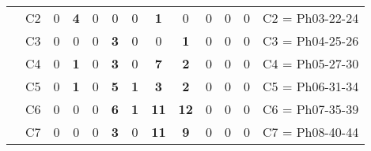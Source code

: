 \begin{table}[H]
{\begin{tabular}{|ccrrrrrrrrrrc|}
\multicolumn{1}{|c|}{}                                      & \multicolumn{1}{c|}{C2} & \multicolumn{1}{c|}{0}          & \multicolumn{1}{c|}{\textbf{4}} & \multicolumn{1}{c|}{0}  & \multicolumn{1}{c|}{0}          & \multicolumn{1}{c|}{0}          & \multicolumn{1}{c|}{\textbf{1}}  & \multicolumn{1}{c|}{0}           & \multicolumn{1}{c|}{0}  & \multicolumn{1}{c|}{0}  & \multicolumn{1}{c|}{0}          & C2 = Ph03-22-24   \\ \cline{2-13}
\multicolumn{1}{|c|}{}                                      & \multicolumn{1}{c|}{C3} & \multicolumn{1}{c|}{0}          & \multicolumn{1}{c|}{0}          & \multicolumn{1}{c|}{0}  & \multicolumn{1}{c|}{\textbf{3}} & \multicolumn{1}{c|}{0}          & \multicolumn{1}{c|}{0}           & \multicolumn{1}{c|}{\textbf{1}}  & \multicolumn{1}{c|}{0}  & \multicolumn{1}{c|}{0}  & \multicolumn{1}{c|}{0}          & C3 = Ph04-25-26   \\ \cline{2-13}
\multicolumn{1}{|c|}{}                                      & \multicolumn{1}{c|}{C4} & \multicolumn{1}{c|}{0}          & \multicolumn{1}{c|}{\textbf{1}} & \multicolumn{1}{c|}{0}  & \multicolumn{1}{c|}{\textbf{3}} & \multicolumn{1}{c|}{0}          & \multicolumn{1}{c|}{\textbf{7}}  & \multicolumn{1}{c|}{\textbf{2}}  & \multicolumn{1}{c|}{0}  & \multicolumn{1}{c|}{0}  & \multicolumn{1}{c|}{0}          & C4 = Ph05-27-30   \\ \cline{2-13}
\multicolumn{1}{|c|}{}                                      & \multicolumn{1}{c|}{C5} & \multicolumn{1}{c|}{0}          & \multicolumn{1}{c|}{\textbf{1}} & \multicolumn{1}{c|}{0}  & \multicolumn{1}{c|}{\textbf{5}} & \multicolumn{1}{c|}{\textbf{1}} & \multicolumn{1}{c|}{\textbf{3}}  & \multicolumn{1}{c|}{\textbf{2}}  & \multicolumn{1}{c|}{0}  & \multicolumn{1}{c|}{0}  & \multicolumn{1}{c|}{0}          & C5 = Ph06-31-34   \\ \cline{2-13}
\multicolumn{1}{|c|}{}                                      & \multicolumn{1}{c|}{C6} & \multicolumn{1}{c|}{0}          & \multicolumn{1}{c|}{0}          & \multicolumn{1}{c|}{0}  & \multicolumn{1}{c|}{\textbf{6}} & \multicolumn{1}{c|}{\textbf{1}} & \multicolumn{1}{c|}{\textbf{11}} & \multicolumn{1}{c|}{\textbf{12}} & \multicolumn{1}{c|}{0}  & \multicolumn{1}{c|}{0}  & \multicolumn{1}{c|}{0}          & C6 = Ph07-35-39   \\ \cline{2-13}
\multicolumn{1}{|c|}{}                                      & \multicolumn{1}{c|}{C7} & \multicolumn{1}{c|}{0}          & \multicolumn{1}{c|}{0}          & \multicolumn{1}{c|}{0}  & \multicolumn{1}{c|}{\textbf{3}} & \multicolumn{1}{c|}{0}          & \multicolumn{1}{c|}{\textbf{11}} & \multicolumn{1}{c|}{\textbf{9}}  & \multicolumn{1}{c|}{0}  & \multicolumn{1}{c|}{0}  & \multicolumn{1}{c|}{0}          & C7 = Ph08-40-44   \\ \cline{2-13}

\end{tabular}}
\end{table}
